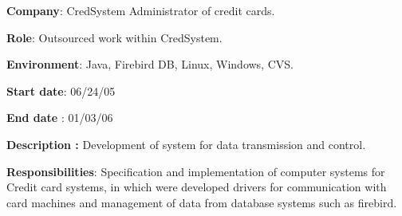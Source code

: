 \begin{itemize}
\begin{justify}
{\fontsize{10pt}{12.0pt}\selectfont \textbf{Company\tab }:\textbf{ }CredSystem Administrator of credit cards.\par}
\end{justify}\par

\begin{justify}
{\fontsize{10pt}{12.0pt}\selectfont \textbf{Role\tab \tab }: Outsourced work within CredSystem.\par}
\end{justify}\par

\begin{justify}
{\fontsize{10pt}{12.0pt}\selectfont \textbf{Environment}:\textbf{ }Java, Firebird DB, Linux, Windows, CVS. \par}
\end{justify}\par

\begin{justify}
{\fontsize{10pt}{12.0pt}\selectfont \textbf{Start date\tab }:\textbf{ }06/24/05\par}
\end{justify}\par

\begin{justify}
{\fontsize{10pt}{12.0pt}\selectfont \textbf{End date \tabto{0.5in} }:\textbf{ }01/03/06\par}
\end{justify}\par

\begin{justify}
{\fontsize{10pt}{12.0pt}\selectfont \textbf{Description \tab : }Development of system for data transmission and control.\par}
\end{justify}\par

\begin{justify}
{\fontsize{10pt}{12.0pt}\selectfont \textbf{Responsibilities}: Specification and implementation of computer systems for Credit card systems, in which were developed drivers for communication with card machines and management of data from database systems such as firebird.\par}
\end{justify}\par

\end{itemize}

